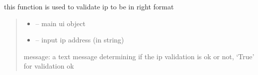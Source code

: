 \documentclass[letterpaper,10pt,english]{sphinxmanual}
\begin{document}

\begin{savenotes}\begin{fulllineitems}
\label{\detokenize{setting/backend/camera_funcs:oxin.backend.camera_funcs.ip_validation}}
\pysigstartsignatures
{}
\pysigstopsignatures
\sphinxAtStartPar
this function is used to validate ip to be in right format
\begin{quote}\begin{description}
\begin{itemize}
\item {} 
\sphinxAtStartPar
{} – main ui object

\item {} 
\sphinxAtStartPar
{} – input ip address (in string)

\end{itemize}

\sphinxAtStartPar
message: a text message determining if the ip validation is ok or not,
‘True’ for validation ok

\end{description}\end{quote}

\end{fulllineitems}\end{savenotes}

\end{document}
